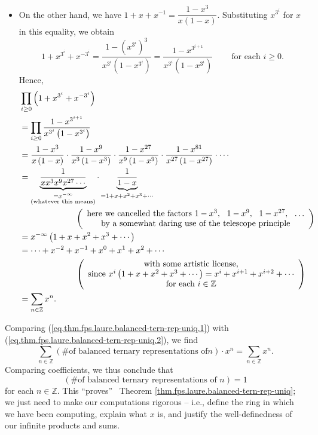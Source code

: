 \begin{itemize}
\item On the other hand, we have $1+x+x^{-1}=\dfrac{1-x^{3}}{x\left(
1-x\right)  }$. Substituting $x^{3^{i}}$ for $x$ in this equality, we obtain%
\[
1+x^{3^{i}}+x^{-3^{i}}=\dfrac{1-\left(  x^{3^{i}}\right)  ^{3}}{x^{3^{i}%
}\left(  1-x^{3^{i}}\right)  }=\dfrac{1-x^{3^{i+1}}}{x^{3^{i}}\left(
1-x^{3^{i}}\right)  }\ \ \ \ \ \ \ \ \ \ \text{for each }i\geq0.
\]
Hence,
\begin{align}
&  \prod_{i\geq0}\left(  1+x^{3^{i}}+x^{-3^{i}}\right) \nonumber\\
&  =\prod_{i\geq0}\dfrac{1-x^{3^{i+1}}}{x^{3^{i}}\left(  1-x^{3^{i}}\right)
}\nonumber\\
&  =\dfrac{1-x^{3}}{x\left(  1-x\right)  }\cdot\dfrac{1-x^{9}}{x^{3}\left(
1-x^{3}\right)  }\cdot\dfrac{1-x^{27}}{x^{9}\left(  1-x^{9}\right)  }%
\cdot\dfrac{1-x^{81}}{x^{27}\left(  1-x^{27}\right)  }\cdot\cdots\nonumber\\
&  =\underbrace{\dfrac{1}{xx^{3}x^{9}x^{27}\cdots}}_{\substack{=x^{-\infty
}\\\text{(whatever this means)}}}\cdot\underbrace{\dfrac{1}{1-x}}%
_{=1+x+x^{2}+x^{3}+\cdots}\nonumber\\
&  \ \ \ \ \ \ \ \ \ \ \ \ \ \ \ \ \ \ \ \ \left(
\begin{array}
[c]{c}%
\text{here we cancelled the factors }1-x^{3},\ \ 1-x^{9},\ \ 1-x^{27}%
,\ \ \ldots\\
\text{by a somewhat daring use of the telescope principle}%
\end{array}
\right) \nonumber\\
&  =x^{-\infty}\left(  1+x+x^{2}+x^{3}+\cdots\right) \nonumber\\
&  =\cdots+x^{-2}+x^{-1}+x^{0}+x^{1}+x^{2}+\cdots\nonumber\\
&  \ \ \ \ \ \ \ \ \ \ \ \ \ \ \ \ \ \ \ \ \left(
\begin{array}
[c]{c}%
\text{with some artistic license,}\\
\text{since }x^{i}\left(  1+x+x^{2}+x^{3}+\cdots\right)  =x^{i}+x^{i+1}%
+x^{i+2}+\cdots\\
\text{for each }i\in\mathbb{Z}%
\end{array}
\right) \nonumber\\
&  =\sum_{n\in\mathbb{Z}}x^{n}.
\label{eq.thm.fps.laure.balanced-tern-rep-uniq.2}%
\end{align}

\end{itemize}

Comparing (\ref{eq.thm.fps.laure.balanced-tern-rep-uniq.1}) with
(\ref{eq.thm.fps.laure.balanced-tern-rep-uniq.2}), we find%
\[
\sum_{n\in\mathbb{Z}}\left(  \text{\# of balanced ternary representations of
}n\right)  \cdot x^{n}=\sum_{n\in\mathbb{Z}}x^{n}.
\]
Comparing coefficients, we thus conclude that%
\[
\left(  \text{\# of balanced ternary representations of }n\right)  =1
\]
for each $n\in\mathbb{Z}$. This \textquotedblleft proves\textquotedblright%
\ Theorem \ref{thm.fps.laure.balanced-tern-rep-uniq}; we just need to make our
computations rigorous -- i.e., define the ring in which we have been
computing, explain what $x$ is, and justify the well-definedness of our
infinite products and sums.

